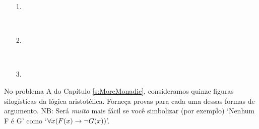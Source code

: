 \begin{itemize}
\item[1.] \begin{fitchproof}
	\open
	\close
{} {}
\end{fitchproof}

\item[] \

\item[2.] \begin{fitchproof}
 {}
 {}
\open
\close
{}
\end{fitchproof}

\item[] \ 

\item[3.] \begin{fitchproof}
\open
\close
{}
\end{fitchproof}
\end{itemize}
 
\problempart
\label{pr.BarbaraEtc.proof1}
No problema A do Capítulo  \ref{s:MoreMonadic}, consideramos quinze figuras silogísticas da lógica aristotélica. Forneça provas para cada uma dessas formas de argumento. NB: Será \emph{muito} mais fácil se você simbolizar (por exemplo) `Nenhum F é G' como `$\forall x (\mathord{F}(x) \rightarrow \neg \mathord{G}(x))$'.

